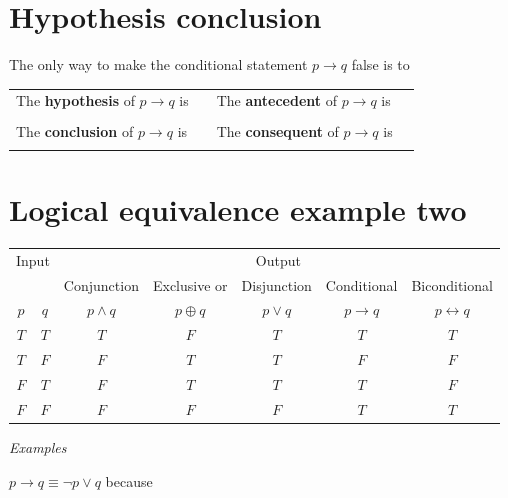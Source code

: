 \documentclass[12pt, oneside]{article}
\begin{document}
\vfill
\vfill \vfill
\section*{Hypothesis conclusion}


The only way to make  the conditional statement $p \to q$ false is to \underline{\phantom{\hspace{3in}}}

\begin{tabular}{llll}
The {\bf  hypothesis}  of $p \to q$ is  &\underline{\phantom{\hspace{1in}}} &
The {\bf  antecedent}  of $p \to q$ is  &\underline{\phantom{\hspace{1in}}} \\
&&&  \\
The {\bf  conclusion}  of $p \to q$ is & \underline{\phantom{\hspace{1in}}}&
The {\bf  consequent}  of $p \to q$ is & \underline{\phantom{\hspace{1in}}}\\
&&&  \\
\end{tabular}

\vfill \vfill
\section*{Logical equivalence example two}


\begin{center}
    \begin{tabular}{cc||c|c|c|c|c}
    \multicolumn{2}{c||}{Input}  & \multicolumn{5}{c}{Output} \\
     & & Conjunction &  Exclusive or & Disjunction  &  Conditional & Biconditional  \\
    $p$ & $q$ & $p \wedge q$ &  $p  \oplus  q$ & $p \vee  q$ & $p \to q$ & $p \leftrightarrow q$\\
    \hline
    $T$ & $T$ & $T$ & $F$ & $T$ & $T$& $T$\\
    $T$ & $F$ & $F$ & $T$ & $T$ & $F$& $F$\\
    $F$ & $T$ & $F$ & $T$ & $T$ & $T$& $F$\\
    $F$ & $F$ & $F$ & $F$ & $F$ & $T$& $T$\\
    \end{tabular}
    \end{center}
    
    {\it Examples} 
    
    $p \to q \equiv \lnot p \lor q$ because \underline{\phantom{\hspace{4in}}} 
    
\end{document}
